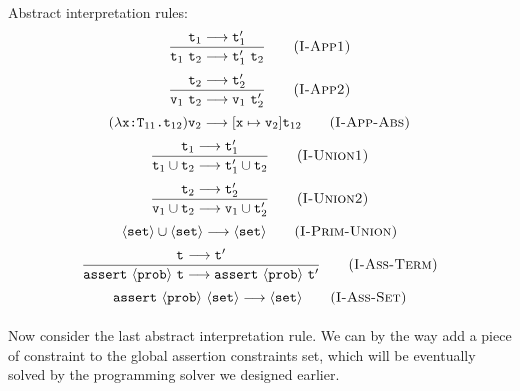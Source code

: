 \documentclass[a4paper]{article}
\begin{document}
\paragraph{}
Abstract interpretation rules:
\begin{equation}
	\frac{\text{\tt t}_{1}\longrightarrow\text{\tt t}^{\prime}_{1}}
	{\text{\tt t}_{1}\ \text{\tt t}_{2}\longrightarrow\text{\tt t}^{\prime}_{1}\ \text{\tt t}_{2}}
	\tag{\sc I-App1}
\end{equation}
\begin{equation}
	\frac{\text{\tt t}_{2}\longrightarrow\text{\tt t}^{\prime}_{2}}
	{\text{\tt v}_{1}\ \text{\tt t}_{2}\longrightarrow\text{\tt v}_{1}\ \text{\tt t}^{\prime}_{2}}
	\tag{\sc I-App2}
\end{equation}
\begin{equation}
	(\lambda\text{\tt x:T$_{11}$.t$_{12}$})\text{\tt v}_2\longrightarrow[\text{\tt x}\mapsto\text{\tt v}_2]\text{\tt t}_{12}\tag{\sc I-App-Abs}
\end{equation}
\begin{equation}
	\frac{\text{\tt t}_1\longrightarrow\text{\tt t}^{\prime}_1}
	{\text{\tt t}_1\cup\text{\tt t}_2 \longrightarrow \text{\tt t}^{\prime}_1\cup\text{\tt t}_2}
	\tag{\sc I-Union1}
\end{equation}
\begin{equation}
	\frac{\text{\tt t}_2\longrightarrow\text{\tt t}^{\prime}_2}
	{\text{\tt v}_1\cup\text{\tt t}_2 \longrightarrow \text{\tt v}_1\cup\text{\tt t}^{\prime}_2}
	\tag{\sc I-Union2}
\end{equation}
\begin{equation}
	\langle\text{\tt set}\rangle\cup\langle\text{\tt set}\rangle \longrightarrow\langle\text{\tt set}\rangle
	\tag{\sc I-Prim-Union}
\end{equation}
\begin{equation}
	\frac{\text{\tt t}_{}\longrightarrow\text{\tt t}^{\prime}_{}}
	{\text{\tt assert}\ \langle\text{\tt prob}\rangle\ \text{\tt t}\longrightarrow\text{\tt assert}\ \langle\text{\tt prob}\rangle\ \text{\tt t}^\prime}
	\tag{\sc I-Ass-Term}
\end{equation}
\begin{equation}
	\text{\tt assert}\ \langle\text{\tt prob}\rangle\ \langle\text{\tt set}\rangle\longrightarrow\langle\text{\tt set}\rangle
	\tag{\sc I-Ass-Set}
\end{equation}
\paragraph{}
Now consider the last abstract interpretation rule. We can by the way add a piece of constraint to the global assertion constraints set, which will be eventually solved by the programming solver we designed earlier.
\end{document}
